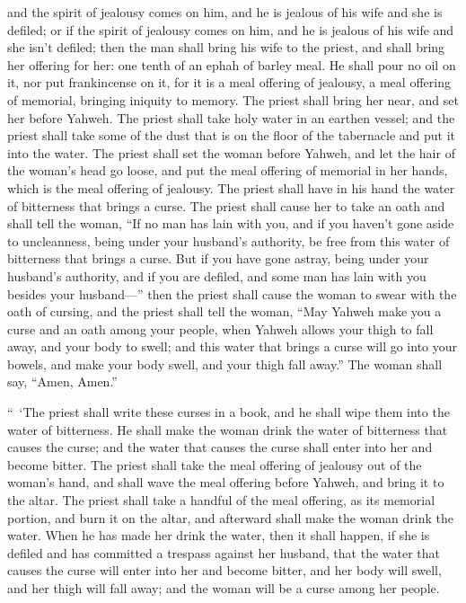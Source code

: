 {and the spirit of jealousy comes on him, and he is jealous of his wife and she is defiled; or if the spirit of jealousy comes on him, and he is jealous of his wife and she isn’t defiled;
then the man shall bring his wife to the priest, and shall bring her offering for her: one tenth of an ephah of barley meal. He shall pour no oil on it, nor put frankincense on it, for it is a meal offering of jealousy, a meal offering of memorial, bringing iniquity to memory.
The priest shall bring her near, and set her before Yahweh.
The priest shall take holy water in an earthen vessel; and the priest shall take some of the dust that is on the floor of the tabernacle and put it into the water.
The priest shall set the woman before Yahweh, and let the hair of the woman’s head go loose, and put the meal offering of memorial in her hands, which is the meal offering of jealousy. The priest shall have in his hand the water of bitterness that brings a curse.
The priest shall cause her to take an oath and shall tell the woman, “If no man has lain with you, and if you haven’t gone aside to uncleanness, being under your husband’s authority, be free from this water of bitterness that brings a curse.
But if you have gone astray, being under your husband’s authority, and if you are defiled, and some man has lain with you besides your husband—”
then the priest shall cause the woman to swear with the oath of cursing, and the priest shall tell the woman, “May Yahweh make you a curse and an oath among your people, when Yahweh allows your thigh to fall away, and your body to swell;
and this water that brings a curse will go into your bowels, and make your body swell, and your thigh fall away.” The woman shall say, “Amen, Amen.”
\par }{\PP {}“ ‘The priest shall write these curses in a book, and he shall wipe them into the water of bitterness.
He shall make the woman drink the water of bitterness that causes the curse; and the water that causes the curse shall enter into her and become bitter.
The priest shall take the meal offering of jealousy out of the woman’s hand, and shall wave the meal offering before Yahweh, and bring it to the altar.
The priest shall take a handful of the meal offering, as its memorial portion, and burn it on the altar, and afterward shall make the woman drink the water.
When he has made her drink the water, then it shall happen, if she is defiled and has committed a trespass against her husband, that the water that causes the curse will enter into her and become bitter, and her body will swell, and her thigh will fall away; and the woman will be a curse among her people.
}

